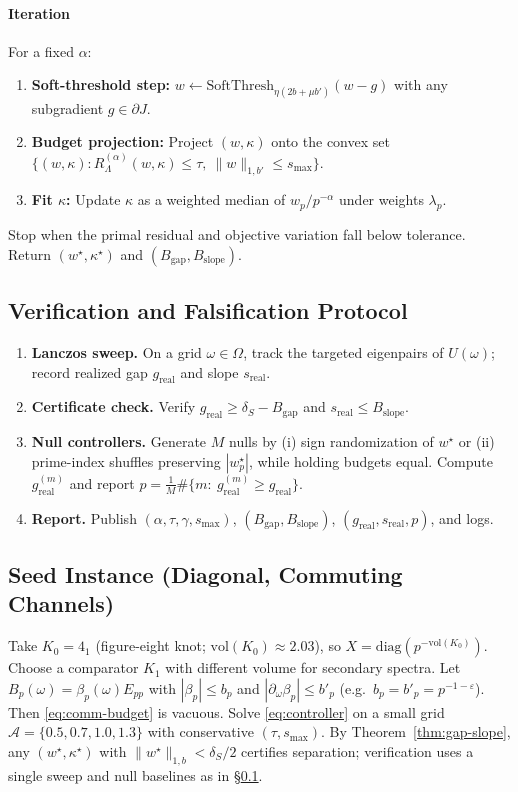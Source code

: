 \documentclass[11pt]{article}
\theoremstyle{definition}
\theoremstyle{remark}
\newcommand{\1}{\mathbf{1}}
\begin{document}
\paragraph{Iteration} For a fixed $\alpha$:
\begin{enumerate}
\item \textbf{Soft-threshold step:} 
$w \leftarrow \mathrm{SoftThresh}_{\eta(2b+\mu b')}(w - g)$ with any subgradient $g\in\partial J$.
\item \textbf{Budget projection:} Project $(w,\kappa)$ onto the convex set 
$\{(w,\kappa):R_{\Lambda}^{(\alpha)}(w,\kappa)\le \tau,\ \|w\|_{1,b'}\le s_{\max}\}$.
\item \textbf{Fit $\kappa$:} Update $\kappa$ as a weighted median of $w_p / p^{-\alpha}$ under weights $\lambda_p$.
\end{enumerate}
Stop when the primal residual and objective variation fall below tolerance. 
Return $(w^\star,\kappa^\star)$ and $(B_{\mathrm{gap}},B_{\mathrm{slope}})$.

\subsection{Verification and Falsification Protocol}
\label{subsec:verify}
\begin{enumerate}
\item \textbf{Lanczos sweep.} On a grid $\omega\in\Omega$, track the targeted eigenpairs of $U(\omega)$; record realized gap $g_{\mathrm{real}}$ and slope $s_{\mathrm{real}}$.
\item \textbf{Certificate check.} Verify $g_{\mathrm{real}}\ge \delta_S-B_{\mathrm{gap}}$ and $s_{\mathrm{real}}\le B_{\mathrm{slope}}$.
\item \textbf{Null controllers.} Generate $M$ nulls by (i) sign randomization of $w^\star$ or (ii) prime-index shuffles preserving $|w_p^\star|$, while holding budgets equal. 
Compute $g_{\mathrm{real}}^{(m)}$ and report $p\!=\!\frac{1}{M}\#\{m:\ g_{\mathrm{real}}^{(m)}\ge g_{\mathrm{real}}\}$.
\item \textbf{Report.} Publish $(\alpha,\tau,\gamma,s_{\max})$, $(B_{\mathrm{gap}},B_{\mathrm{slope}})$, $(g_{\mathrm{real}},s_{\mathrm{real}},p)$, and logs.
\end{enumerate}

\subsection{Seed Instance (Diagonal, Commuting Channels)}
\label{subsec:seed}
Take $K_0=4_1$ (figure-eight knot; $\mathrm{vol}(K_0)\approx2.03$), so $X=\mathrm{diag}(p^{-\mathrm{vol}(K_0)})$.
Choose a comparator $K_1$ with different volume for secondary spectra.
Let $B_p(\omega)=\beta_p(\omega)E_{pp}$ with $|\beta_p|\le b_p$ and $|\partial_\omega \beta_p|\le b'_p$
(e.g.\ $b_p=b'_p=p^{-1-\varepsilon}$). Then \eqref{eq:comm-budget} is vacuous.
Solve \eqref{eq:controller} on a small grid $\mathcal A=\{0.5,0.7,1.0,1.3\}$ with conservative $(\tau,s_{\max})$.
By Theorem~\ref{thm:gap-slope}, any $(w^\star,\kappa^\star)$ with $\|w^\star\|_{1,b}<\delta_S/2$ certifies separation; 
verification uses a single sweep and null baselines as in \S\ref{subsec:verify}.
\end{document}
